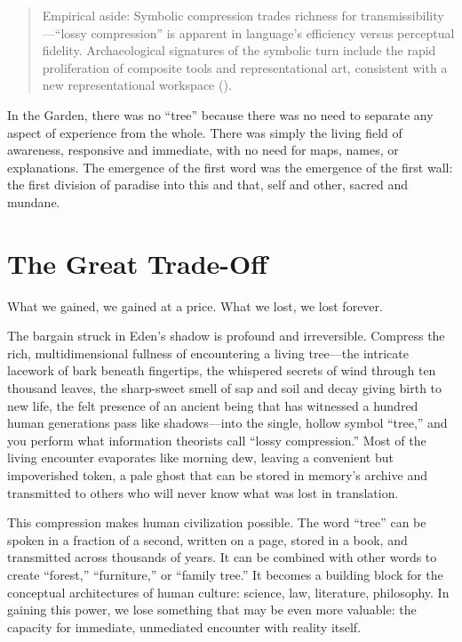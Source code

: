 \begin{quote}\small
Empirical aside: Symbolic compression trades richness for transmissibility—“lossy compression” is apparent in language’s efficiency versus perceptual fidelity. Archaeological signatures of the symbolic turn include the rapid proliferation of composite tools and representational art, consistent with a new representational workspace (\parencite{dunbar1996grooming}).
\end{quote}

In the Garden, there was no “tree” because there was no need to separate any aspect of experience from the whole. There was simply the living field of awareness, responsive and immediate, with no need for maps, names, or explanations. The emergence of the first word was the emergence of the first wall: the first division of paradise into this and that, self and other, sacred and mundane.

\section{The Great Trade-Off}

What we gained, we gained at a price. What we lost, we lost forever.

The bargain struck in Eden's shadow is profound and irreversible. Compress the rich, multidimensional fullness of encountering a living tree—the intricate lacework of bark beneath fingertips, the whispered secrets of wind through ten thousand leaves, the sharp-sweet smell of sap and soil and decay giving birth to new life, the felt presence of an ancient being that has witnessed a hundred human generations pass like shadows—into the single, hollow symbol “tree,” and you perform what information theorists call “lossy compression.” Most of the living encounter evaporates like morning dew, leaving a convenient but impoverished token, a pale ghost that can be stored in memory's archive and transmitted to others who will never know what was lost in translation.

This compression makes human civilization possible. The word “tree” can be spoken in a fraction of a second, written on a page, stored in a book, and transmitted across thousands of years. It can be combined with other words to create “forest,” “furniture,” or “family tree.” It becomes a building block for the conceptual architectures of human culture: science, law, literature, philosophy. In gaining this power, we lose something that may be even more valuable: the capacity for immediate, unmediated encounter with reality itself.

